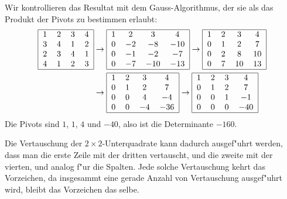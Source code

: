 \begin{loesung}
\begin{teilaufgaben}
Wir kontrollieren das Resultat mit dem Gauss-Algorithmus, der
sie als das Produkt der Pivots zu bestimmen erlaubt:
\begin{align*}
\begin{tabular}{|cccc|}
\hline
1&2&3&4\\
3&4&1&2\\
2&3&4&1\\
4&1&2&3\\
\hline
\end{tabular}
&
\rightarrow
\begin{tabular}{|cccc|}
\hline
1&2&3&4\\
0&$-2$&$-8$&$-10$\\
0&$-1$&$-2$&$-7$\\
0&$-7$&$-10$&$-13$\\
\hline
\end{tabular}
\rightarrow
\begin{tabular}{|cccc|}
\hline
1&2&3&4\\
0&$1$&$2$&$7$\\
0&$2$&$8$&$10$\\
0&$7$&$10$&$13$\\
\hline
\end{tabular}
\\
&
\rightarrow
\begin{tabular}{|cccc|}
\hline
1&2&3&4\\
0&$1$&$2$&$7$\\
0&$0$&$4$&$-4$\\
0&$0$&$-4$&$-36$\\
\hline
\end{tabular}
\rightarrow
\begin{tabular}{|cccc|}
\hline
1&2&3&4\\
0&$1$&$2$&$7$\\
0&$0$&$1$&$-1$\\
0&$0$&$0$&$-40$\\
\hline
\end{tabular}
\end{align*}
Die Pivots sind $1$, $1$, $4$ und $-40$, also ist die Determinante $-160$.

\item Die Vertauschung der $2\times 2$-Unterquadrate kann dadurch
ausgef"uhrt werden, dass man die erste Zeile mit der dritten vertauscht,
und die zweite mit der vierten, und analog f"ur die Spalten. Jede
solche Vertauschung kehrt das Vorzeichen, da insgesammt eine gerade
Anzahl von Vertauschung ausgef"uhrt wird, bleibt das Vorzeichen das
selbe.
\end{teilaufgaben}
\end{loesung}
